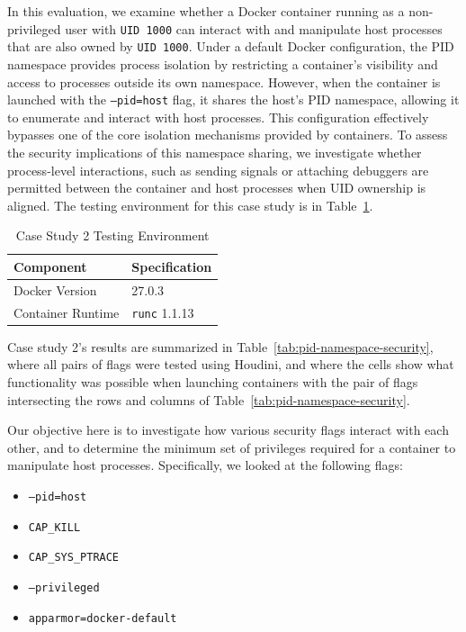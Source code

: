 \documentclass[12pt]{report}
\begin{document}
\begin{doublespace}
In this evaluation, we examine whether a Docker container running as a non-privileged user with \texttt{UID 1000} can interact with and manipulate host processes that are also owned by \texttt{UID 1000}. Under a default Docker configuration, the PID namespace provides process isolation by restricting a container's visibility and access to processes outside its own namespace. However, when the container is launched with the \texttt{--pid=host} flag, it shares the host’s PID namespace, allowing it to enumerate and interact with host processes. This configuration effectively bypasses one of the core isolation mechanisms provided by containers. To assess the security implications of this namespace sharing, we investigate whether process-level interactions, such as sending signals or attaching debuggers are permitted between the container and host processes when UID ownership is aligned. The testing environment for this case study is in Table~\ref{table:case2env}.

\begin{table}[h!]
\caption{Case Study 2 Testing Environment\label{table:case2env}}
\centering
\scriptsize \begin{tabular}{|l|l|} 
\hline
\textbf{Component} & \textbf{Specification} \\
\hline
Docker Version & 27.0.3 \\
\hline
Container Runtime & \texttt{runc} 1.1.13 \\
\hline
\end{tabular}
\end{table}

Case study 2's results are summarized in Table~\ref{tab:pid-namespace-security}, where all pairs of flags were tested using Houdini, and where the cells show what functionality was possible when launching containers with the pair of flags intersecting the rows and columns of Table~\ref{tab:pid-namespace-security}. 

Our objective here is to investigate how various security flags interact with each other, and to determine the minimum set of privileges required for a container to manipulate host processes. Specifically, we looked at the following flags:

\begin{itemize}
    \item \texttt{--pid=host}
    \item \texttt{CAP\_KILL}
    \item \texttt{CAP\_SYS\_PTRACE}
    \item \texttt{--privileged}
    \item \texttt{apparmor=docker-default}
\end{itemize}


\end{doublespace}
\end{document}
